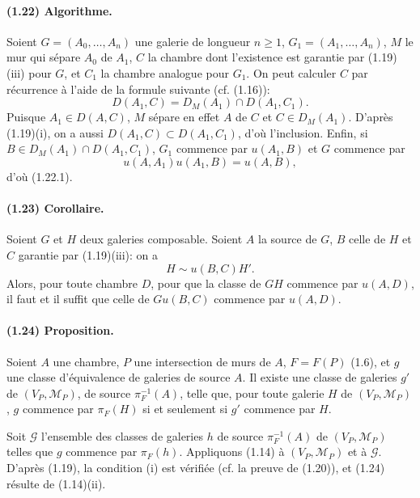 \documentclass[10pt,a4paper]{article}
\newcommand{\mcG}{\mathcal G}
\begin{document}
\paragraph{(1.22) Algorithme.} Soient $G=(A_0,\ldots,A_n)$ une galerie de longueur $n\ge1$, $G_1=(A_1,\ldots,A_n)$, $M$ le mur qui sépare $A_0$ de $A_1$, $C$ la chambre dont l'existence est garantie par (1.19)(iii) pour $G$, et $C_1$ la chambre analogue pour $G_1$. On peut calculer $C$ par récurrence à l'aide de la formule suivante (cf. (1.16)):
\[
\tag{1.22.1}
D(A_1,C)=D_M(A_1)\cap D(A_1,C_1).
\]
Puisque $A_1\in D(A,C)$, $M$ sépare en effet $A$ de $C$ et $C\in D_M(A_1)$. D'après (1.19)(i), on a aussi $D(A_1,C)\subset D(A_1,C_1)$, d'où l'inclusion. Enfin, si $B\in D_M(A_1)\cap D(A_1,C_1)$, $G_1$ commence par $u(A_1,B)$ et $G$ commence par
\[
u(A,A_1)u(A_1,B)=u(A,B),
\]
d'où (1.22.1).

\paragraph{(1.23) Corollaire.} Soient $G$ et $H$ deux galeries composable. Soient $A$ la source de $G$, $B$ celle de $H$ et $C$ garantie par (1.19)(iii): on a
\[
H\sim u(B,C)H'.
\]
Alors, pour toute chambre $D$, pour que la classe de $GH$ commence par $u(A,D)$, il faut et il suffit que celle de $Gu(B,C)$ commence par $u(A,D)$.




\paragraph{(1.24) Proposition.} Soient \(A\) une chambre, \(P\) une intersection de murs de \(A\), \(F=F(P)\) (1.6), et \(g\) une classe d'équivalence de galeries de source \(A\). Il existe une classe de galeries \(g'\) de \((V_P,\mathcal M_P)\), de source \(\pi_F^{-1}(A)\), telle que, pour toute galerie \(H\) de \((V_P,\mathcal M_P)\), \(g\) commence par \(\pi_F(H)\) si et seulement si \(g'\) commence par \(H\).

Soit \(\mcG\) l'ensemble des classes de galeries \(h\) de source \(\pi_F^{-1}(A)\) de \((V_P,\mathcal M_P)\) telles que \(g\) commence par \(\pi_F(h)\). Appliquons (1.14) à \((V_P,\mathcal M_P)\) et à \(\mcG\). D'après (1.19), la condition (i) est vérifiée (cf. la preuve de (1.20)), et (1.24) résulte de (1.14)(ii).
\end{document}
